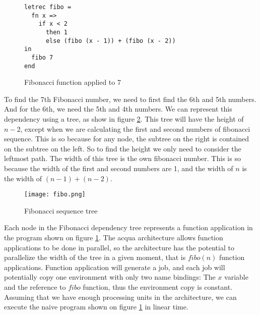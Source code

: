 \begin{figure}
  \caption{Fibonacci function applied to 7}
  \begin{lstlisting}[language=l1]
letrec fibo =
  fn x =>
    if x < 2
      then 1
      else (fibo (x - 1)) + (fibo (x - 2))
in
  fibo 7
end
  \end{lstlisting}
  \label{fig:fib-l1}
\end{figure}

To find the 7th Fibonacci number, we need to first find the 6th and 5th numbers. And for the 6th, we need the 5th and 4th numbers. We can represent this dependency using a tree, as show in figure \ref{fig:fibo}. This tree will have the height of $n-2$, except when we are calculating the first and second numbers of fibonacci sequence. This is so because for any node, the subtree on the right is contained on the subtree on the left. So to find the height we only need to consider the leftmost path. The width of this tree is the own fibonacci number. This is so because the width of the first and second numbers are 1, and the width of $n$ is the width of $(n-1) + (n-2)$.

\begin{figure}
    \caption{Fibonacci sequence tree}
    \centerline{
      \texttt{[image: fibo.png]}
    }
    \label{fig:fibo}
\end{figure}

Each node in the Fibonacci dependency tree represents a function application in the program shown on figure \ref{fig:fib-l1}. The acqua architecture allows function applications to be done in parallel, so the architecture has the potential to parallelize the width of the tree in a given moment, that is $fibo(n)$ function applications. Function application will generate a job, and each job will potentially copy one environment with only two name bindings: The $x$ variable and the reference to $fibo$ function, thus the environment copy is constant. Assuming that we have enough processing units in the architecture, we can execute the naive program shown on figure \ref{fig:fib-l1} in linear time.
